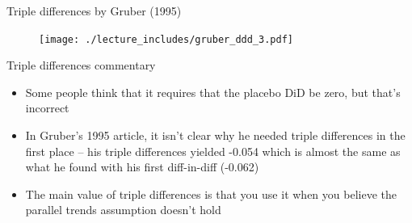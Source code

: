 \documentclass{beamer}
\begin{document}
\begin{frame}{Triple differences by Gruber (1995)}
	
	\begin{figure}
	\texttt{[image: ./lecture\_includes/gruber\_ddd\_3.pdf]}
	\end{figure}
	
\end{frame}

\begin{frame}{Triple differences commentary}

\begin{itemize}
\item Some people think that it requires that the placebo DiD be zero, but that's incorrect

\item In Gruber's 1995 article, it isn't clear why he needed triple differences in the first place -- his triple differences yielded -0.054 which is almost the same as what he found with his first diff-in-diff (-0.062)
\item The main value of triple differences is that you use it when you believe the parallel trends assumption doesn't hold

\end{itemize}

\end{frame}
\end{document}
